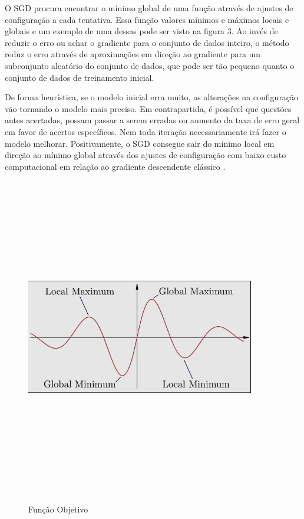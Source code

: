 O SGD procura encontrar o mínimo global de uma função através de ajustes de configuração a cada tentativa. Essa função valores mínimos e máximos locais e globais e um exemplo de uma dessas pode ser visto na figura 3. Ao invés de reduzir o erro ou achar o gradiente para o conjunto de dados inteiro, o método reduz o erro através de aproximações em direção ao gradiente para um subconjunto aleatório do conjunto de dados, que pode ser tão pequeno quanto o conjunto de dados de treinamento inicial.

De forma heurística, se o modelo inicial erra muito, as alterações na configuração vão tornando o modelo mais preciso. Em contrapartida, é possível que questões antes acertadas, possam passar a serem erradas ou aumento da taxa de erro geral em favor de acertos específicos. Nem toda iteração necessariamente irá fazer o modelo melhorar.
Positivamente, o SGD consegue sair do mínimo local em direção ao mínimo global através dos ajustes de configuração com baixo custo computacional em relação ao gradiente descendente clássico \cite{overview_gradient_descent_stochastic}.

\begin{figure}[ht]
    \centering
    \caption{Função Objetivo}
    \includegraphics[width=10cm,height=14cm,keepaspectratio]{figuras/funcao_objetivo.png} 
    \label{fig:internet} 
\end{figure}

